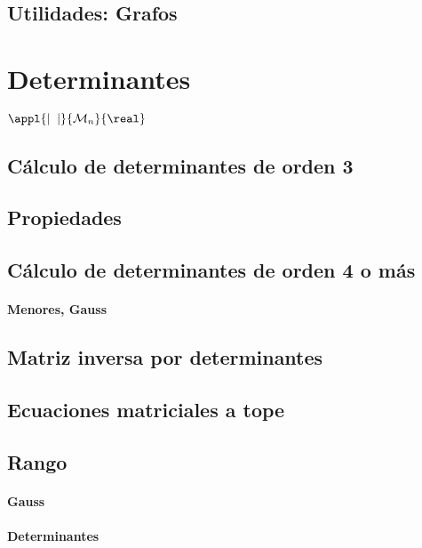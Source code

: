 \subsection{Utilidades: Grafos}

\section{Determinantes}

\begin{defn}[Determinante]
$\appl{|\;\;|}{\mathcal{M}_n}{\real}$
\end{defn}

\subsection{Cálculo de determinantes de orden 3}

\subsection{Propiedades}

\subsection{Cálculo de determinantes de orden 4 o más}

\paragraph{Menores, Gauss}

\subsection{Matriz inversa por determinantes}

\subsection{Ecuaciones matriciales a tope}

\subsection{Rango}
\paragraph{Gauss}

\paragraph{Determinantes}

